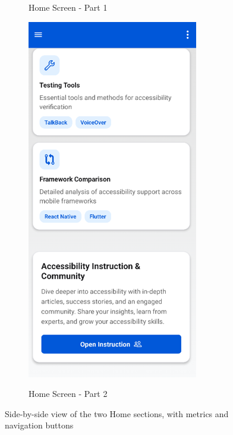 \begin{figure}[ht]
\begin{subfigure}[b]{0.48\textwidth}
        \caption{Home Screen - Part 1}
        \label{fig:home-left}
    \end{subfigure}
    \hfill
    \begin{subfigure}[b]{0.49\textwidth}
        \centering
        \includegraphics[width=\linewidth, alt={Second part of the Home Screen}]{img/home2.png}
        \caption{Home Screen - Part 2}
        \label{fig:home-right}
    \end{subfigure}
    \caption{Side-by-side view of the two Home sections, with metrics and navigation buttons}
    \label{fig:home_screens_sidebyside}
\end{figure}

